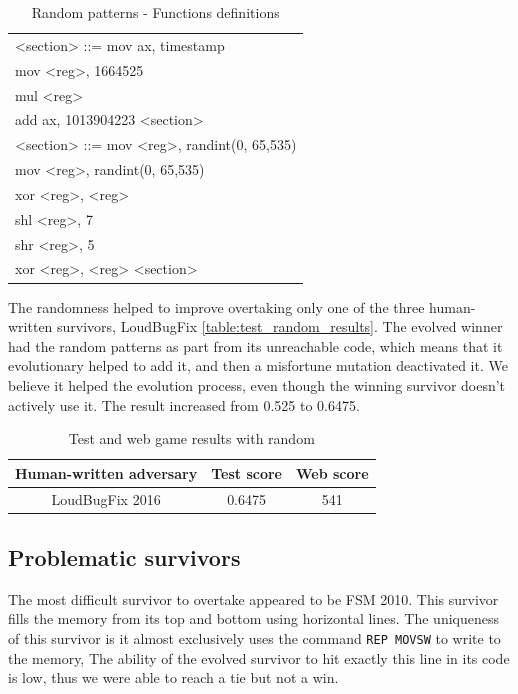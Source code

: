 \documentclass[dvipsnames,format=sigconf,anonymous=true,review=true]{acmart}
\begin{document}
 \begin{table}[!ht]
\centering
\begin{tabular}{p{15.6cm}} 
<section> ::= mov ax, timestamp\\
\quad\quad\quad\quad mov <reg>, 1664525\\
\quad\quad\quad\quad mul <reg>\\
\quad\quad\quad\quad add ax, 1013904223 <section>
\\
<section> ::= mov <reg>, randint(0, 65,535)\\
\quad\quad\quad\quad mov <reg>, randint(0, 65,535)\\
\quad\quad\quad\quad xor <reg>, <reg>\\
\quad\quad\quad\quad shl <reg>, 7\\
\quad\quad\quad\quad shr <reg>, 5\\
\quad\quad\quad\quad xor <reg>, <reg> <section>
\\
\end{tabular}
\caption{Random patterns - Functions definitions}
\label{table3_random_set}
\end{table}

The randomness helped to improve overtaking only one of the three human-written survivors, LoudBugFix \autoref{table:test_random_results}. The evolved winner had the random patterns as part from its unreachable code, which means that it evolutionary helped to add it, and then 
a misfortune mutation deactivated it. We believe it helped the evolution process, even though the winning survivor doesn't actively use it. The result increased from 0.525 to 0.6475.

\begin{table}[!ht]
\centering
\begin{tabular}{|c|c|c|} 
\hline
\multicolumn{1}{|c|}{\textbf{Human-written adversary}} &
\multicolumn{1}{c|}{\textbf{Test score}} &
\multicolumn{1}{c|}{\textbf{Web score}} \\ [0.5ex] \hline\hline
LoudBugFix 2016 & 0.6475 & 541 \\ \hline
\end{tabular}
\caption{Test and web game results with random}
\label{table:test_random_results}
\end{table}

\subsection{Problematic survivors}
The most difficult survivor to overtake appeared to be FSM 2010. This survivor fills the memory from its top and bottom using horizontal lines. The uniqueness of this survivor is it almost exclusively uses the command \texttt{REP MOVSW} to write to the memory, The ability of the evolved survivor to hit exactly this line in its code is low, thus we were able to reach a tie but not a win.
\end{document}

